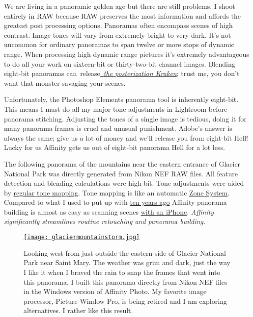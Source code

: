 We are living in a panoramic golden age but there are still problems. I
shoot entirely in RAW because RAW preserves the most information and
affords the greatest post processing options. Panoramas often encompass
scenes of high contrast. Image tones will vary from extremely bright to
very dark. It's not uncommon for ordinary panoramas to span twelve or
more stops of dynamic range. When processing high dynamic range pictures
it's extremely advantageous to do all your work on sixteen-bit or
thirty-two-bit channel images. Blending eight-bit panoramas
can~release\href{https://www.youtube.com/watch?v=7SqC_m3yUDU}{~\emph{the
posterization Kraken}}; trust me, you don't want that monster savaging
your scenes.

Unfortunately, the Photoshop Elements panorama tool is inherently
eight-bit. This means I must do all my major tone adjustments in
Lightroom before panorama stitching. Adjusting the tones of a single
image is tedious, doing it for many panorama frames is cruel and unusual
punishment. Adobe's answer is always the same; give us a lot of money
and we'll release you from eight-bit Hell! Lucky for us Affinity gets us
out of eight-bit panorama Hell for a lot less.

The following panorama of the mountains near the eastern entrance of
Glacier National Park was directly generated from Nikon NEF RAW files.
All feature detection and blending calculations were high-bit. Tone
adjustments were aided by \href{https://vimeo.com/192632826}{regular
tone mapping}. Tone mapping is like an automatic
\href{https://en.wikipedia.org/wiki/Zone_System}{Zone System}. Compared
to what I used to put up with
\href{https://conceptcontrol.smugmug.com/Trips/USA-and-Canada/Arizona-Toodling-1/i-fMPPrqd/A}{ten
years ago} Affinity panorama building is almost as easy as scanning
scenes
\href{https://conceptcontrol.smugmug.com/Themes/Manipulations/Panoramas-1/i-phFMbnJ/A}{with
an iPhone}. \emph{Affinity significantly streamlines routine retouching
and panorama building.}



\begin{figure}
\centering
\href{https://conceptcontrol.smugmug.com/Themes/Manipulations/Panoramas-1/i-DDThBLs/A}{\texttt{[image: glaciermountainstorm.jpg]}}
\caption{Looking west from just outside the eastern side of Glacier National Park
near Saint Mary. The weather was grim and dark, just the way I like it
when I braved the rain to snap the frames that went into this panorama.
I built this panorama directly from Nikon NEF files in the Windows
version of Affinity Photo. My favorite image processor, Picture Window
Pro, is being retired and I am exploring alternatives. I rather like
this result.}
\label{fig:5317X1}
\end{figure}


